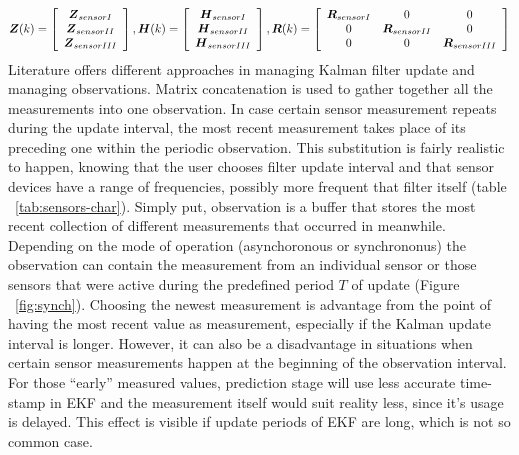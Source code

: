 \begin{equation}
\label{eq:concatenate-mes} 
\boldsymbol{Z}(k) = \left[ \begin{array}{c} \boldsymbol{Z}_{sensor I} \\ \boldsymbol{Z}_{sensor II} \\ \boldsymbol{Z}_{sensor III} \end{array} \right],
\boldsymbol{H}(k) = \left[ \begin{array}{c} \boldsymbol{H}_{sensor I} \\ \boldsymbol{H}_{sensor II} \\ \boldsymbol{H}_{sensor III} \end{array} \right], 
\boldsymbol{R}(k) = \left[ \begin{array}{ccc} \boldsymbol{R}_{sensor I} & 0 & 0 \\ 0 & \boldsymbol{R}_{sensor II} & 0 \\ 0 & 0 & \boldsymbol{R}_{sensor III} \end{array} \right]
\end{equation}
Literature offers different approaches in managing Kalman filter update and managing observations. Matrix concatenation is used to gather together all the measurements into one observation. In case certain sensor measurement repeats during the update interval, the most recent measurement takes place of its preceding one within the periodic observation. This substitution is fairly realistic to happen, knowing that the user chooses filter update interval and that sensor devices have a range of frequencies, possibly more frequent that filter itself (table ~\ref{tab:sensors-char}). Simply put, observation is a buffer that stores the most recent collection of different measurements that occurred in meanwhile. Depending on the mode of operation (asynchoronous or synchrononus) the observation can contain the measurement from an individual sensor or those sensors that were active during the predefined period $T$ of update (Figure ~\ref{fig:synch}). Choosing the newest measurement is advantage from the point of having the most recent value as measurement, especially if the Kalman update interval is longer. However, it can also be a disadvantage in situations when certain sensor measurements happen at the beginning of the observation interval. For those ``early'' measured values, prediction stage will use less accurate time-stamp in EKF and the measurement itself would suit reality less, since it's usage is delayed. This effect is visible if update periods of EKF are long, which is not so common case.  

